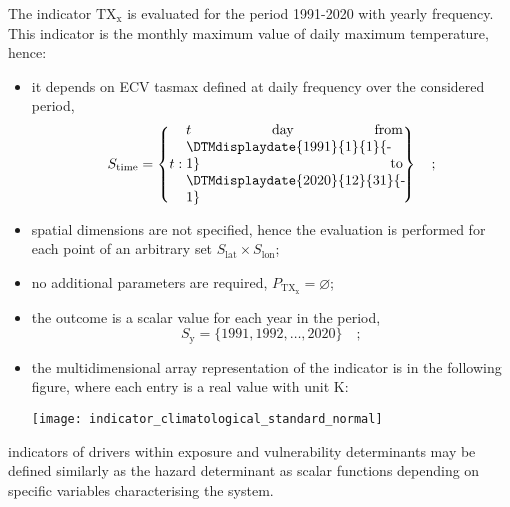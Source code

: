 \begin{example}
  The \gls{indicator} $\mathrm{TX_x}$ is evaluated for the period 1991-2020 with yearly frequency. This \gls{indicator} is the monthly maximum value of daily maximum temperature,\cite{ETCCDIClimate} hence:
  \begin{itemize}
    \item it depends on \gls{ECV} \glsdesc{tasmax} defined at daily frequency over the considered period,
      \begin{equation*}
        S_\text{time} = \left\{ t : \parbox{0.45\linewidth}{$t$ day from \DTMdisplaydate{1991}{1}{1}{-1} to \DTMdisplaydate{2020}{12}{31}{-1}} \right\}
        \quad ;
      \end{equation*}
    \item spatial dimensions are not specified, hence the evaluation is performed for each point of an arbitrary set $S_\text{lat} \times S_\text{lon}$;
    \item no additional parameters are required, $P_\mathrm{TX_x} = \varnothing$;
    \item the outcome is a scalar value for each year in the period,
      \begin{equation*}
        S_\text{y} = \{ 1991, 1992, \dots, 2020 \}
        \quad ;
      \end{equation*}
    \item the multidimensional array representation of the \gls{indicator} is in the following figure, where each entry is a real value with unit \unit{\kelvin}:
      \begin{center}
        \texttt{[image: indicator\_climatological\_standard\_normal]}
      \end{center}
  \end{itemize}
\end{example}

\Glspl{indicator} of \glspl{driver} within \gls{exposure} and \gls{vulnerability} \glspl{determinant} may be defined similarly as the \gls{hazard} \gls{determinant} as scalar functions depending on specific variables characterising the system.
